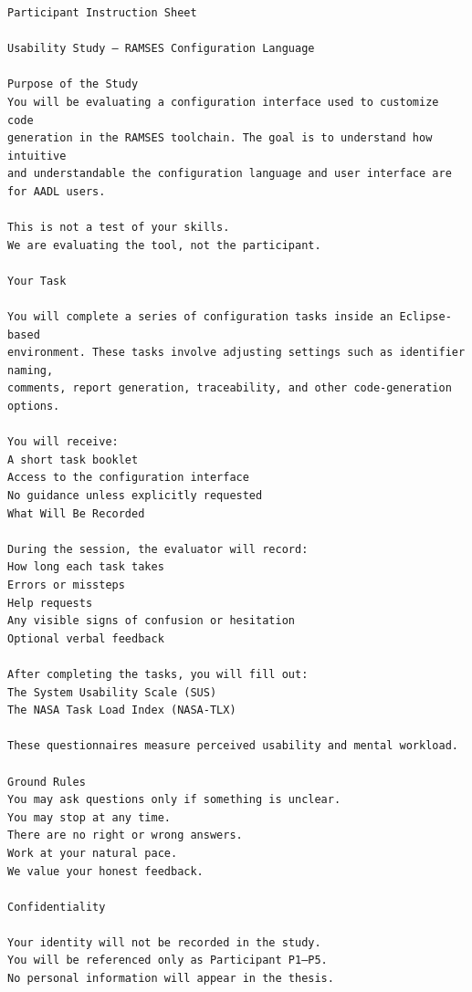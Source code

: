 \begin{verbatim}
Participant Instruction Sheet

Usability Study – RAMSES Configuration Language

Purpose of the Study
You will be evaluating a configuration interface used to customize code 
generation in the RAMSES toolchain. The goal is to understand how intuitive 
and understandable the configuration language and user interface are for AADL users.

This is not a test of your skills.
We are evaluating the tool, not the participant.

Your Task

You will complete a series of configuration tasks inside an Eclipse-based 
environment. These tasks involve adjusting settings such as identifier naming, 
comments, report generation, traceability, and other code-generation options.

You will receive:
A short task booklet
Access to the configuration interface
No guidance unless explicitly requested
What Will Be Recorded

During the session, the evaluator will record:
How long each task takes
Errors or missteps
Help requests
Any visible signs of confusion or hesitation
Optional verbal feedback

After completing the tasks, you will fill out:
The System Usability Scale (SUS)
The NASA Task Load Index (NASA-TLX)

These questionnaires measure perceived usability and mental workload.

Ground Rules
You may ask questions only if something is unclear.
You may stop at any time.
There are no right or wrong answers.
Work at your natural pace.
We value your honest feedback.

Confidentiality

Your identity will not be recorded in the study.
You will be referenced only as Participant P1–P5.
No personal information will appear in the thesis.
\end{verbatim}





